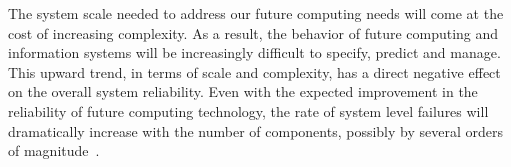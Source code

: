 
The system scale needed to address our future computing needs will come at the cost of increasing complexity. As a result, the behavior of future computing and information systems will be increasingly difficult to specify, predict and manage.
This upward trend, in terms of scale and complexity, has a direct negative effect on the overall system reliability. 
Even with the expected improvement in the reliability of future computing technology, 
the rate of system level failures will dramatically increase with the number of 
components, possibly by several orders of magnitude~\cite{ferreira_sc_2011}. 
%

